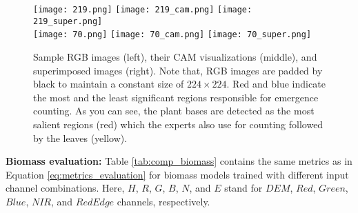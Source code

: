 \documentclass[10pt,twocolumn,letterpaper]{article}
\begin{document}
\begin{figure}[]
	\centering
	\texttt{[image: 219.png]}
	\texttt{[image: 219\_cam.png]}
	\texttt{[image: 219\_super.png]} \\
	\texttt{[image: 70.png]}
	\texttt{[image: 70\_cam.png]}
	\texttt{[image: 70\_super.png]}
    \caption{Sample RGB images (left), their CAM \cite{cam-mit} visualizations (middle), and superimposed images (right). Note that, RGB images are padded by black to maintain a constant size of $224\times 224$. Red and blue indicate the most and the least significant regions responsible for emergence counting. As you can see, the plant bases are detected as the most salient regions (red) which the experts also use for counting followed by the leaves (yellow).}
    \label{fig:cam}
\end{figure}


\textbf{Biomass evaluation: } Table \ref{tab:comp_biomass} contains the same metrics as in Equation \ref{eq:metrics_evaluation} for biomass models trained with different input channel combinations. Here, $H$, $R$, $G$, $B$, $N$, and $E$ stand for $DEM$, $Red$, $Green$, $Blue$, $NIR$, and $Red Edge$ channels, respectively.
\end{document}
